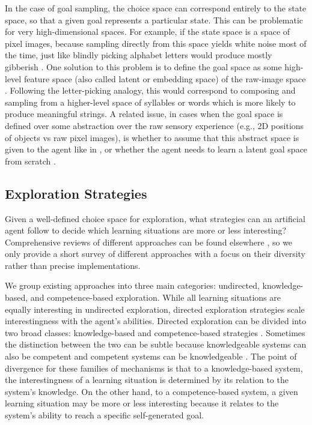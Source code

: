 In the case of goal sampling, the choice space can correspond entirely to the state space, so that a given goal represents a particular state. This can be problematic for very high-dimensional spaces. For example, if the state space is a space of pixel images, because sampling directly from this space yields white noise most of the time, just like blindly picking alphabet letters would produce mostly gibberish \parencite{nair_visual_2018}. One solution to this problem is to define the goal space as some high-level feature space (also called latent or embedding space) of the raw-image space \parencite[e.g.,][]{laversanne-finot_intrinsically_2021}. Following the letter-picking analogy, this would correspond to composing and sampling from a higher-level space of syllables or words which is more likely to produce meaningful strings. A related issue, in cases when the goal space is defined over some abstraction over the raw sensory experience (e.g., 2D positions of objects vs raw pixel images), is whether to assume that this abstract space is given to the agent like in \citeauthor{forestier_intrinsically_2020} \parencite{forestier_intrinsically_2020}, or whether the agent needs to learn a latent goal space from scratch \parencite[e.g.,][]{nair_visual_2018,laversanne-finot_intrinsically_2021}.

\subsection{Exploration Strategies}\label{CH3_SS_exploration_strategies}
Given a well-defined choice space for exploration, what strategies can an artificial agent follow to decide which learning situations are more or less interesting? Comprehensive reviews of different approaches can be found elsewhere \parencite{oudeyer_what_2007,mirolli_functions_2013,aubret_survey_2019,linke_adapting_2020}, so we only provide a short survey of different approaches with a focus on their diversity rather than precise implementations. 

We group existing approaches into three main categories: undirected, knowledge-based, and competence-based exploration. While all learning situations are equally interesting in undirected exploration, directed exploration strategies scale interestingness with the agent’s abilities. Directed exploration can be divided into two broad classes: knowledge-based and competence-based strategies \parencite{oudeyer_what_2007}. Sometimes the distinction between the two can be subtle because knowledgeable systems can also be competent and competent systems can be knowledgeable \parencite{mirolli_functions_2013}. The point of divergence for these families of mechanisms is that to a knowledge-based system, the interestingness of a learning situation is determined by its relation to the system’s knowledge. On the other hand, to a competence-based system, a given learning situation may be more or less interesting because it relates to the system’s ability to reach a specific self-generated goal.

